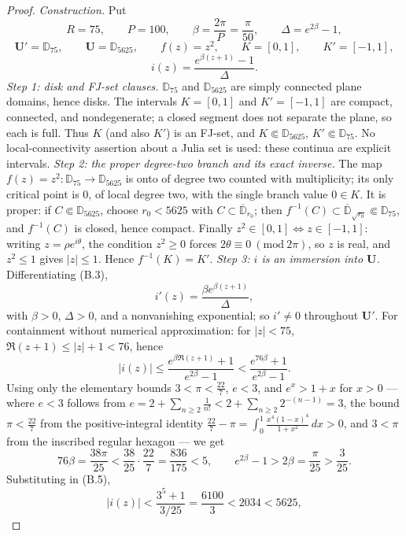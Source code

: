 \begin{proof}
\emph{Construction.} Put
\[ R=75,\qquad P=100,\qquad \beta=\frac{2\pi}{P}=\frac{\pi}{50},\qquad \Delta=e^{2\beta}-1, \tag{B.1} \]
\[ \mathbf U'=\mathbb D_{75},\qquad \mathbf U=\mathbb D_{5625},\qquad f(z)=z^2,\qquad K=[0,1],\qquad K'=[-1,1], \tag{B.2} \]
\[ i(z)=\frac{e^{\beta(z+1)}-1}{\Delta}. \tag{B.3} \]
\emph{Step 1: disk and FJ-set clauses.} \(\mathbb D_{75}\) and \(\mathbb D_{5625}\) are simply connected plane domains, hence disks. The intervals \(K=[0,1]\) and \(K'=[-1,1]\) are compact, connected, and nondegenerate; a closed segment does not separate the plane, so each is full. Thus \(K\) (and also \(K'\)) is an FJ-set, and \(K\Subset\mathbb D_{5625}\), \(K'\Subset\mathbb D_{75}\). No local-connectivity assertion about a Julia set is used: these continua are explicit intervals.
\emph{Step 2: the proper degree-two branch and its exact inverse.} The map \(f(z)=z^2:\mathbb D_{75}\to\mathbb D_{5625}\) is onto of degree two counted with multiplicity; its only critical point is \(0\), of local degree two, with the single branch value \(0\in K\). It is proper: if \(C\Subset\mathbb D_{5625}\), choose \(r_0<5625\) with \(C\subset\overline{\mathbb D}_{r_0}\); then \(f^{-1}(C)\subset\overline{\mathbb D}_{\sqrt{r_0}}\Subset\mathbb D_{75}\), and \(f^{-1}(C)\) is closed, hence compact. Finally \(z^2\in[0,1]\iff z\in[-1,1]\): writing \(z=\rho e^{i\theta}\), the condition \(z^2\ge0\) forces \(2\theta\equiv0\ (\mathrm{mod}\ 2\pi)\), so \(z\) is real, and \(z^2\le1\) gives \(|z|\le1\). Hence \(f^{-1}(K)=K'\).
\emph{Step 3: \(i\) is an immersion into \(\mathbf U\).} Differentiating (B.3),
\[ i'(z)=\frac{\beta e^{\beta(z+1)}}{\Delta}, \tag{B.4} \]
with \(\beta>0\), \(\Delta>0\), and a nonvanishing exponential; so \(i'\ne0\) throughout \(\mathbf U'\). For containment without numerical approximation: for \(|z|<75\), \(\Re(z+1)\le|z|+1<76\), hence
\[ |i(z)|\le\frac{e^{\beta\Re(z+1)}+1}{e^{2\beta}-1}<\frac{e^{76\beta}+1}{e^{2\beta}-1}. \tag{B.5} \]
Using only the elementary bounds \(3<\pi<\tfrac{22}{7}\), \(e<3\), and \(e^{x}>1+x\) for \(x>0\) — where \(e<3\) follows from \(e=2+\sum_{n\ge2}\tfrac1{n!}<2+\sum_{n\ge2}2^{-(n-1)}=3\), the bound \(\pi<\tfrac{22}{7}\) from the positive-integral identity \(\tfrac{22}{7}-\pi=\int_0^1\tfrac{x^4(1-x)^4}{1+x^2}\,dx>0\), and \(3<\pi\) from the inscribed regular hexagon — we get
\[ 76\beta=\frac{38\pi}{25}<\frac{38}{25}\cdot\frac{22}{7}=\frac{836}{175}<5,\qquad e^{2\beta}-1>2\beta=\frac{\pi}{25}>\frac{3}{25}. \]
Substituting in (B.5),
\[ |i(z)|<\frac{3^{5}+1}{3/25}=\frac{6100}{3}<2034<5625, \]

\end{proof}
